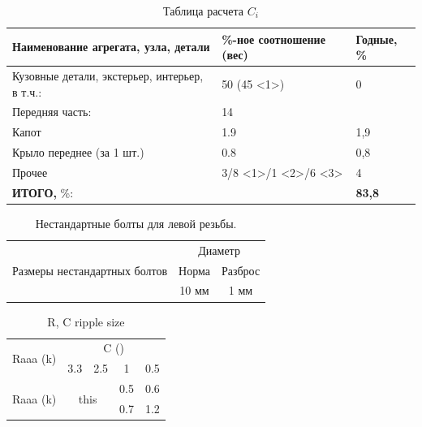
\begin{longtable}{|p{9cm}|p{4cm}|p{2cm}|}
	\caption[]{\footnotesize {Таблица расчета $ C_i $ }}
	\label{tab:7}\\
	\hline
	Наименование агрегата, узла, детали & \%-ное соотношение (вес)  & Годные, \% \\
	\hline \endhead
	Кузовные детали, экстерьер, интерьер, в т.ч.: & 50 (45 \textless{}1\textgreater{}) & 0 \\
	Передняя часть: & 14 &  \\
	Капот & 1.9 & 1,9 \\
	Крыло переднее (за 1 шт.) & 0.8 & 0,8 \\

	Прочее & 3/8 \textless{}1\textgreater{}/1 \textless{}2\textgreater /6 \textless{}3\textgreater{} & 4 \\
	\hline
	\textbf{ИТОГО,} \%: &  & \textbf{83,8}  \\
	\hline	
\end{longtable}
\begin{table}[H]
	\caption{\label{tab:bolts} Нестандартные болты для левой резьбы.}
	\begin{center}
		\begin{tabular}{|c|c|c|}
			\hline
			\multirow{3}{*}{Размеры нестандартных болтов} & \multicolumn{2}{c|}{Диаметр} \\
			\cline{2-3}
			& Норма & Разброс \\
			\cline{2-3}
			& 10 мм & 1 мм \\
			\hline
		\end{tabular}
	\end{center}
\end{table}

\begin{table}[ph]
	\centering
	\begin{tabular}{c|c|c|c|c}
		\hline
		\multirow{2}{*}{Raaa (k)} & \multicolumn{4}{c}{C ()} \\
		\hhline{~----}
		& 3.3 & 2.5 & 1 & 0.5 \\
		\hline
		\multirow{2}{*}{Raaa (k)} & \multicolumn{2}{c|}{\multirow{2}{*}{this}} & 0.5 & 0.6\\
		\hhline{~~~--}            & \multicolumn{2}{c|}{}                      & 0.7 & 1.2 \\
		\hline
	\end{tabular}
	\caption{R, C ripple size}
	\label{T:peak}
\end{table}

